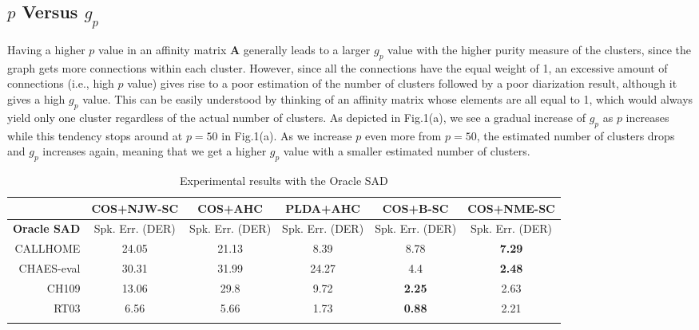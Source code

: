 \documentclass[journal]{IEEEtran}
\begin{document}
\subsection{$p$ Versus $g_p$}
Having a higher $p$ value in an affinity matrix $\mathbf{A}$ generally leads to a larger $g_p$ value with the higher purity measure of the clusters, since the graph gets more connections within each cluster. However, since all the connections have the equal weight of 1, an excessive amount of connections (i.e., high $p$ value) gives rise to a poor estimation of the number of clusters followed by a poor diarization result, although it gives a high $g_p$ value. This can be easily understood by thinking of an affinity matrix whose elements are all equal to 1, which would always yield only one cluster regardless of the actual number of clusters. As depicted in Fig.1(a), we see a gradual increase of $g_p$ as $p$ increases while this tendency stops around at $p=50$ in Fig.1(a). As we increase $p$ even more from $p=50$, the estimated number of clusters drops and $g_p$ increases again, meaning that we get a higher $g_p$ value with a smaller estimated number of clusters.   
\begin{table*}[t]
\caption{Experimental results with the Oracle SAD}
\vspace{-3.0ex}
\small
\label{tab:oracle_SAD}
\begin{center}
 \begin{tabular}{ r | c | c | c | c | c }
\Xhline{3\arrayrulewidth}
 & COS+NJW-SC  & COS+AHC & PLDA+AHC & COS+B-SC & COS+NME-SC  \\
 \hline
\textbf{Oracle SAD} & Spk. Err. (DER) & Spk. Err. (DER) & Spk. Err. (DER) & Spk. Err. (DER) &  Spk. Err. (DER) \\
\Xhline{3\arrayrulewidth}
CALLHOME & 24.05 & 21.13 & 8.39 & 8.78 & \textbf{7.29} \\ 
CHAES-eval & 30.31 & 31.99 &24.27 & 4.4  & \textbf{2.48}  \\
CH109 & 13.06 & 29.8 &9.72  & \textbf{2.25} & 2.63 \\
RT03& 6.56 & 5.66 & 1.73  & \textbf{0.88} & 2.21 \\
 \Xhline{3\arrayrulewidth}
\end{tabular}
\end{center}
\vspace{-3.0ex}
\end{table*}
\end{document}
